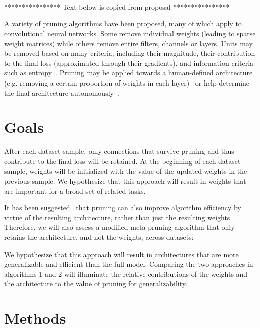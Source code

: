 \documentclass{article}
\begin{document}
\ \\ 
\ \\
\ \\

**************** Text below is copied from proposal ****************

A variety of pruning algorithms have been proposed, many of which apply to convolutional neural networks. Some remove individual weights (leading to sparse weight matrices) while others remove entire filters, channels or layers. Units may be removed based on many criteria, including their magnitude, their contribution to the final loss (approximated through their gradients), and information criteria such as entropy~\citet{NIPS_learning_weights_pruning, prune_transfer_learning, prune_entropy, prune_slimming}.  Pruning may be applied towards a human-defined architecture (e.g. removing a certain proportion of weights in each layer)~\citet{prune_nisp} or help determine the final architecture autonomously~\citet{prune_thinet}. 

\section{Goals}





After each dataset sample, only connections that survive pruning and thus contribute to the final loss will be retained.  At the beginning of each dataset sample, weights will be initialized with the value of the updated weights in the previous sample. We hypothesize that this approach will result in weights that are important for a broad set of related tasks. 

It has been suggested~\citet{prune_for_architecture} that pruning can also improve algorithm efficiency by virtue of the resulting architecture, rather than just the resulting weights. Therefore, we will also assess a modified meta-pruning algorithm that only retains the architecture, and not the weights, across datasets:



We hypothesize that this approach will result in architectures that are more generalizable and efficient than the full model. Comparing the two approaches in algorithms 1 and 2 will illuminate the relative contributions of the weights and the architecture to the value of pruning for generalizability. 

\section{Methods}
\end{document}
